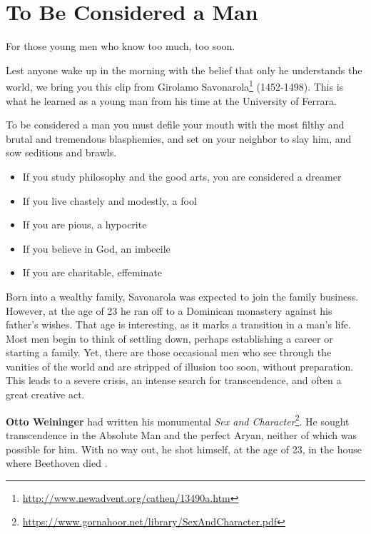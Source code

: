 \section{To Be Considered a Man}

For those young men who know too much, too soon.

Lest anyone wake up in the morning with the belief that only he understands the world, we bring you this clip from Girolamo Savonarola\footnote{\url{http://www.newadvent.org/cathen/13490a.htm}} (1452-1498). This is what he learned as a young man from his time at the University of Ferrara.

\begin{quotex}
To be considered a man you must defile your mouth with the most filthy and brutal and tremendous blasphemies, and set on your neighbor to slay him, and sow seditions and brawls.

\begin{itemize}


\item If you study philosophy and the good arts, you are considered a dreamer

\item If you live chastely and modestly, a fool

\item If you are pious, a hypocrite

\item If you believe in God, an imbecile

\item If you are charitable, effeminate
\end{itemize}
\end{quotex}


Born into a wealthy family, Savonarola was expected to join the family business. However, at the age of 23 he ran off to a Dominican monastery against his father's wishes. That age is interesting, as it marks a transition in a man's life. Most men begin to think of settling down, perhaps establishing a career or starting a family. Yet, there are those occasional men who see through the vanities of the world and are stripped of illusion too soon, without preparation. This leads to a severe crisis, an intense search for transcendence, and often a great creative act.

\textbf{Otto Weininger} had written his monumental
\textit{Sex and Character}\footnote{\url{https://www.gornahoor.net/library/SexAndCharacter.pdf}}. He sought transcendence in the Absolute Man and the perfect Aryan, neither of which was possible for him. With no way out, he shot himself, at the age of 23, in the house where Beethoven died .


